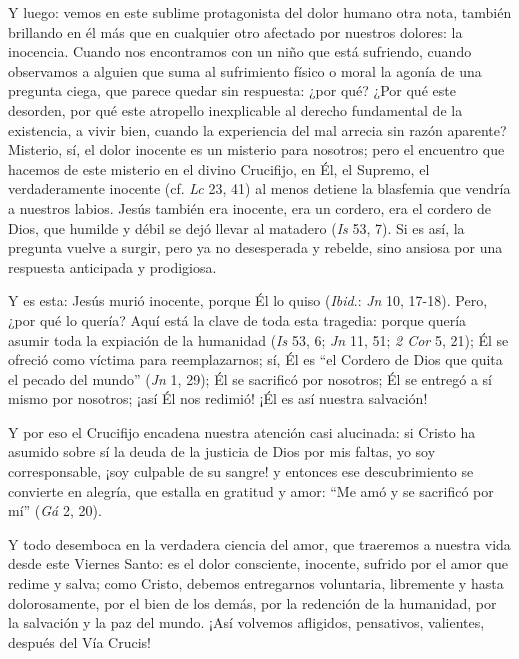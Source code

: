 			\begin{body}Y luego: vemos en este sublime protagonista del dolor humano otra nota, también brillando en él más que en cualquier otro afectado por nuestros dolores: la inocencia. Cuando nos encontramos con un niño que está sufriendo, cuando observamos a alguien que suma al sufrimiento físico o moral la agonía de una pregunta ciega, que parece quedar sin respuesta: ¿por qué? ¿Por qué este desorden, por qué este atropello inexplicable al derecho fundamental de la existencia, a vivir bien, cuando la experiencia del mal arrecia sin razón aparente? Misterio, sí, el dolor inocente es un misterio para nosotros; pero el encuentro que hacemos de este misterio en el divino Crucifijo, en Él, el Supremo, el verdaderamente inocente (cf. \textit{Lc} 23, 41) al menos detiene la blasfemia que vendría a nuestros labios. Jesús también era inocente, era un cordero, era el cordero de Dios, que humilde y débil se dejó llevar al matadero (\textit{Is} 53, 7). Si es así, la pregunta vuelve a surgir, pero ya no desesperada y rebelde, sino ansiosa por una respuesta anticipada y prodigiosa.\end{body}
			
			\begin{body}Y es esta: Jesús murió inocente, porque Él lo quiso (\textit{Ibid}.: \textit{Jn} 10, 17-18). Pero, ¿por qué lo quería? Aquí está la clave de toda esta tragedia: porque quería asumir toda la expiación de la humanidad (\textit{Is} 53, 6; \textit{Jn} 11, 51; \textit{2 Cor} 5, 21); Él se ofreció como víctima para reemplazarnos; sí, Él es “el Cordero de Dios que quita el pecado del mundo” (\textit{Jn} 1, 29); Él se sacrificó por nosotros; Él se entregó a sí mismo por nosotros; ¡así Él nos redimió! ¡Él es así nuestra salvación! \end{body}
			
			\begin{body}Y por eso el Crucifijo encadena nuestra atención casi alucinada: si Cristo ha asumido sobre sí la deuda de la justicia de Dios por mis faltas, yo soy corresponsable, ¡soy culpable de su sangre! y entonces ese descubrimiento se convierte en alegría, que estalla en gratitud y amor: “Me amó y se sacrificó por mí” (\textit{Gá} 2, 20). \end{body}
			
			\begin{body}Y todo desemboca en la verdadera ciencia del amor, que traeremos a nuestra vida desde este Viernes Santo: es el dolor consciente, inocente, sufrido por el amor que redime y salva; como Cristo, debemos entregarnos voluntaria, libremente y hasta dolorosamente, por el bien de los demás, por la redención de la humanidad, por la salvación y la paz del mundo. ¡Así volvemos afligidos, pensativos, valientes, después del Vía Crucis!\end{body}
			
